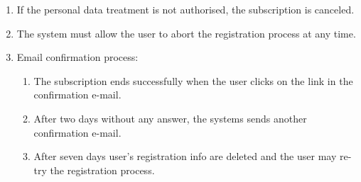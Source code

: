 \begin{enumerate}
    \item If the personal data treatment is not authorised, the subscription is canceled. \label{f-dataTreat}
    \item The system must allow the user to abort the registration process at any time.
    \item Email confirmation process:
    \begin{enumerate}
    \item The subscription ends successfully when the user clicks on the link in the confirmation e-mail.
    \item After two days without any answer, the systems sends another confirmation e-mail.
    \item After seven days user's registration info are deleted and the user may re-try the registration process.  \label{f-confirm}
   \end{enumerate}
\end{enumerate}
